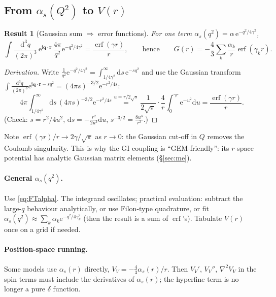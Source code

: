 \documentclass[11pt,a4paper]{article}
\numberwithin{equation}{section}
\theoremstyle{definition}
\theoremstyle{plain}
\newtheorem{result}[definition]{Result}
\theoremstyle{remark}
\numberwithin{algorithm}{section}
\newcommand{\vr}{\bm r}
\newcommand{\vq}{\bm q}
\newcommand{\as}{\alpha_s}
\newcommand{\dd}{\mathrm{d}}
\newcommand{\ii}{\mathrm{i}}
\newcommand{\ee}{\mathrm{e}}
\newcommand{\erf}{\operatorname{erf}}
\begin{document}
\subsection{\texorpdfstring{From $\as(Q^2)$ to $V(r)$}{From alpha\_s(Q2) to V(r)}}
\begin{result}[Gaussian sum $\Rightarrow$ error functions]
For one term $\as(q^2)=\alpha\,\ee^{-q^2/4\gamma^2}$,
\begin{equation}
\int\frac{\dd^3q}{(2\pi)^3}\,\ee^{\ii\vq\cdot\vr}\,\frac{4\pi}{q^2}\ee^{-q^2/4\gamma^2}=\frac{\erf(\gamma r)}{r},
\qquad\text{hence}\qquad G(r)=-\frac43\sum_k\frac{\alpha_k}{r}\erf(\gamma_kr).
\end{equation}
\end{result}
\begin{proof}[Derivation]
Write $\frac1{q^2}\ee^{-q^2/4\gamma^2}=\int_{1/4\gamma^2}^\infty\dd s\,\ee^{-sq^2}$ and use the Gaussian transform $\int\frac{\dd^3q}{(2\pi)^3}\ee^{\ii\vq\cdot\vr-sq^2}=(4\pi s)^{-3/2}\ee^{-r^2/4s}$:
\begin{equation}
4\pi\int_{1/4\gamma^2}^\infty\dd s\,(4\pi s)^{-3/2}\ee^{-r^2/4s}
\overset{u=r/2\sqrt s}{=}\frac{1}{2\sqrt\pi}\cdot\frac4r\int_0^{\gamma r}\ee^{-u^2}\dd u=\frac{\erf(\gamma r)}{r}.
\end{equation}
(Check: $s=r^2/4u^2$, $\dd s=-\frac{r^2}{2u^3}\dd u$, $s^{-3/2}=\frac{8u^3}{r^3}$.)
\end{proof}
Note $\erf(\gamma r)/r\to2\gamma/\sqrt\pi$ as $r\to0$: the Gaussian cut-off in $Q$ removes the Coulomb singularity. This is why the GI coupling is ``GEM-friendly'': its $r$-space potential has analytic Gaussian matrix elements (\S\ref{sec:me}).

\paragraph{General $\as(q^2)$.} Use \eqref{eq:FTalpha}. The integrand oscillates; practical evaluation: subtract the large-$q$ behaviour analytically, or use Filon-type quadrature, or fit $\as(q^2)\approx\sum_k\alpha_k\ee^{-q^2/4\gamma_k^2}$ (then the result is a sum of $\erf$'s). Tabulate $V(r)$ once on a grid if needed.

\paragraph{Position-space running.} Some models use $\as(r)$ directly, $V_V=-\frac43\as(r)/r$. Then $V_V'$, $V_V''$, $\nabla^2V_V$ in the spin terms must include the derivatives of $\as(r)$; the hyperfine term is no longer a pure $\delta$ function.
\end{document}
